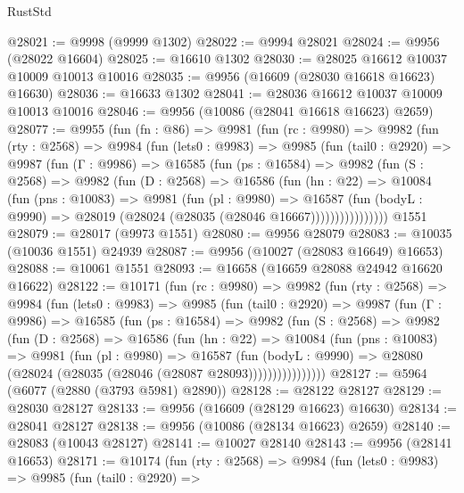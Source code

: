 \begin{lexlean}{RustStd}
\begin{coremodule}
@28021 := @9998 (@9999 @1302)
@28022 := @9994 @28021
@28024 := @9956 (@28022 @16604)
@28025 := @16610 @1302
@28030 := @28025 @16612 @10037 @10009 @10013 @10016
@28035 := @9956 (@16609 (@28030 @16618 @16623) @16630)
@28036 := @16633 @1302
@28041 := @28036 @16612 @10037 @10009 @10013 @10016
@28046 := @9956 (@10086 (@28041 @16618 @16623) @2659)
@28077 := @9955
    (fun (fn : @86) =>
    @9981
      (fun (rc : @9980) =>
      @9982
        (fun (rty : @2568) =>
        @9984
          (fun (lets0 : @9983) =>
          @9985
            (fun (tail0 : @2920) =>
            @9987
              (fun (Γ : @9986) =>
              @16585
                (fun (ps : @16584) =>
                @9982
                  (fun (S : @2568) =>
                  @9982
                    (fun (D : @2568) =>
                    @16586
                      (fun (hn : @22) =>
                      @10084
                        (fun (pns : @10083) =>
                        @9981
                          (fun (pl : @9980) =>
                          @16587
                            (fun (bodyL : @9990) =>
                            @28019 (@28024 (@28035 (@28046 @16667))))))))))))))))
    @1551
@28079 := @28017 (@9973 @1551)
@28080 := @9956 @28079
@28083 := @10035 (@10036 @1551) @24939
@28087 := @9956 (@10027 (@28083 @16649) @16653)
@28088 := @10061 @1551
@28093 := @16658 (@16659 @28088 @24942 @16620 @16622)
@28122 := @10171
    (fun (rc : @9980) =>
    @9982
      (fun (rty : @2568) =>
      @9984
        (fun (lets0 : @9983) =>
        @9985
          (fun (tail0 : @2920) =>
          @9987
            (fun (Γ : @9986) =>
            @16585
              (fun (ps : @16584) =>
              @9982
                (fun (S : @2568) =>
                @9982
                  (fun (D : @2568) =>
                  @16586
                    (fun (hn : @22) =>
                    @10084
                      (fun (pns : @10083) =>
                      @9981
                        (fun (pl : @9980) =>
                        @16587
                          (fun (bodyL : @9990) =>
                          @28080 (@28024 (@28035 (@28046 (@28087 @28093))))))))))))))))
@28127 := @5964 (@6077 (@2880 (@3793 @5981) @2890))
@28128 := @28122 @28127
@28129 := @28030 @28127
@28133 := @9956 (@16609 (@28129 @16623) @16630)
@28134 := @28041 @28127
@28138 := @9956 (@10086 (@28134 @16623) @2659)
@28140 := @28083 (@10043 @28127)
@28141 := @10027 @28140
@28143 := @9956 (@28141 @16653)
@28171 := @10174
    (fun (rty : @2568) =>
    @9984
      (fun (lets0 : @9983) =>
      @9985
        (fun (tail0 : @2920) =>

\end{coremodule}
\end{lexlean}
